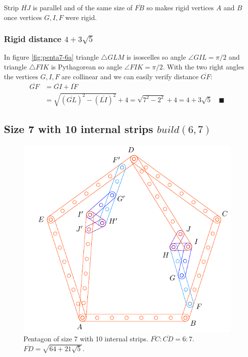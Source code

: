 \documentclass[11pt]{article}
\begin{document}
Strip $\overline{HJ}$ is parallel and of the same size of $\overline{FB}$ so makes rigid vertices $A$ and $B$ once vertices $G,I,F$ were rigid.

\subsubsection{Rigid distance $4 + 3\sqrt5$}

In figure \ref{fig:penta7-6a} triangle $\triangle{GLM}$ is isoscelles so angle $\angle{GIL} = \pi / 2$ and triangle $\triangle{FIK}$ is Pythagorean so angle $\angle{FIK} = \pi / 2$. With the two right angles the vertices $G,I,F$ are collinear and we can easily verify distance $\overline{GF}$:
\begin{align}
\overline{GF} &= \overline{GI} + \overline{IF} \nonumber\\
 &= \sqrt{(\overline{GL})^2 - (\overline{LI})^2} + 4 
 = \sqrt{7^2 - 2^2} + 4 = 4 + 3\sqrt{5} \quad \blacksquare
\end{align}

\subsection{Size 7 with 10 internal strips $build(6,7)$}

\begin{figure}[h]
\centering
\includegraphics[scale=1]{7/penta7-10a}
\caption{Pentagon of size 7 with 10 internal strips. $\overline{FC}:\overline{CD} = 6:7$. $\overline{FD} = \sqrt{64 + 21\sqrt5}$.}
\label{fig:penta7-10a}
\end{figure}
\end{document}
